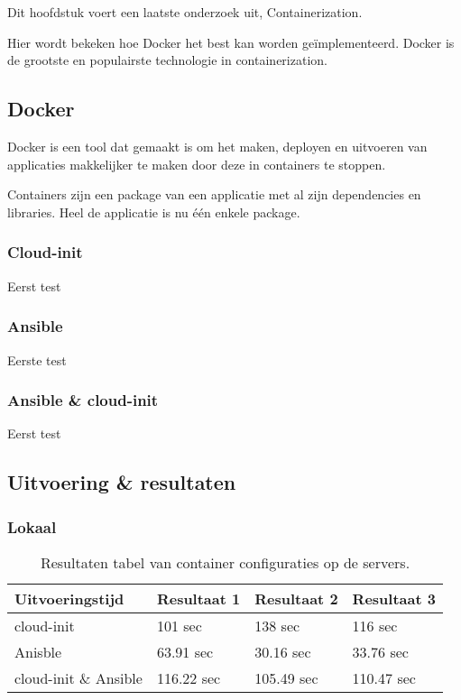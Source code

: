 \chapter{}
\label{ch:container}
Dit hoofdstuk voert een laatste onderzoek uit, Containerization.

Hier wordt bekeken hoe Docker het best kan worden geïmplementeerd. Docker is de grootste en populairste technologie in containerization.

\section{Docker}
Docker is een tool dat gemaakt is om het maken, deployen en uitvoeren van applicaties makkelijker te maken door deze in containers te stoppen. 

Containers zijn een package van een applicatie met al zijn dependencies en libraries. Heel de applicatie is nu één enkele package. \autocite{docker}


\subsection{Cloud-init}
Eerst test

\subsection{Ansible}
Eerste test

\subsection{Ansible \& cloud-init}
Eerst test

\section{Uitvoering \& resultaten}

\subsection{Lokaal}

\begin{table}[!htb]
	\centering
	\begin{tabular}{| l | l | l |l |}
        \hline
        \textbf{Uitvoeringstijd} & Resultaat 1 & Resultaat 2 & Resultaat 3   \\ \hline
        cloud-init & 101 sec & 138 sec & 116 sec  \\ \hline
        Anisble & 63.91 sec & 30.16 sec & 33.76 sec \\ \hline
        cloud-init \& Ansible & 116.22 sec & 105.49 sec & 110.47 sec \\
        \hline
    \end{tabular}
	\caption{Resultaten tabel van container configuraties op de servers.}
	\label{tab:tabel resultaten container}
\end{table}





